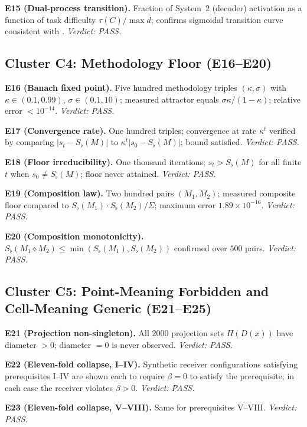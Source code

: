 \documentclass[twocolumn,11pt,a4paper]{article}
\newcommand{\Sfloor}{S_{\flat}}
\newcommand{\abs}[1]{\lvert#1\rvert}
\newcommand{\Compose}{\diamond}
\begin{document}
\textbf{E15 (Dual-process transition).}  Fraction of System~2 (decoder)
activation as a function of task difficulty $\tau(C)/\max d$; confirms
sigmoidal transition curve consistent with .
\textit{Verdict: PASS.}

\subsection{Cluster C4: Methodology Floor (E16--E20)}
\label{sec:c4}

\textbf{E16 (Banach fixed point).}  Five hundred methodology triples
$(\kappa,\sigma)$ with $\kappa\in(0.1,0.99)$, $\sigma\in(0.1,10)$;
measured attractor equals $\sigma\kappa/(1-\kappa)$; relative error
$<10^{-14}$.  \textit{Verdict: PASS.}

\textbf{E17 (Convergence rate).}  One hundred triples; convergence at
rate $\kappa^t$ verified by comparing $\abs{s_t-\Sfloor(M)}$ to
$\kappa^t\abs{s_0-\Sfloor(M)}$; bound satisfied.
\textit{Verdict: PASS.}

\textbf{E18 (Floor irreducibility).}  One thousand iterations; $s_t>
\Sfloor(M)$ for all finite $t$ when $s_0\neq\Sfloor(M)$; floor never
attained.  \textit{Verdict: PASS.}

\textbf{E19 (Composition law).}  Two hundred pairs $(M_1,M_2)$;
measured composite floor compared to
$\Sfloor(M_1)\cdot\Sfloor(M_2)/\Sigma$; maximum error $1.89\times
10^{-16}$.  \textit{Verdict: PASS.}

\textbf{E20 (Composition monotonicity).}  $\Sfloor(M_1\Compose M_2)\leq
\min(\Sfloor(M_1),\Sfloor(M_2))$ confirmed over $500$ pairs.
\textit{Verdict: PASS.}

\subsection{Cluster C5: Point-Meaning Forbidden and Cell-Meaning Generic (E21--E25)}
\label{sec:c5}

\textbf{E21 (Projection non-singleton).}  All $2000$ projection sets
$\Pi(D(x))$ have diameter $>0$; diameter $=0$ is never observed.
\textit{Verdict: PASS.}

\textbf{E22 (Eleven-fold collapse, I--IV).}  Synthetic receiver
configurations satisfying prerequisites I--IV are shown each to require
$\beta=0$ to satisfy the prerequisite; in each case the receiver violates
$\beta>0$.  \textit{Verdict: PASS.}

\textbf{E23 (Eleven-fold collapse, V--VIII).}  Same for prerequisites
V--VIII.  \textit{Verdict: PASS.}
\end{document}

